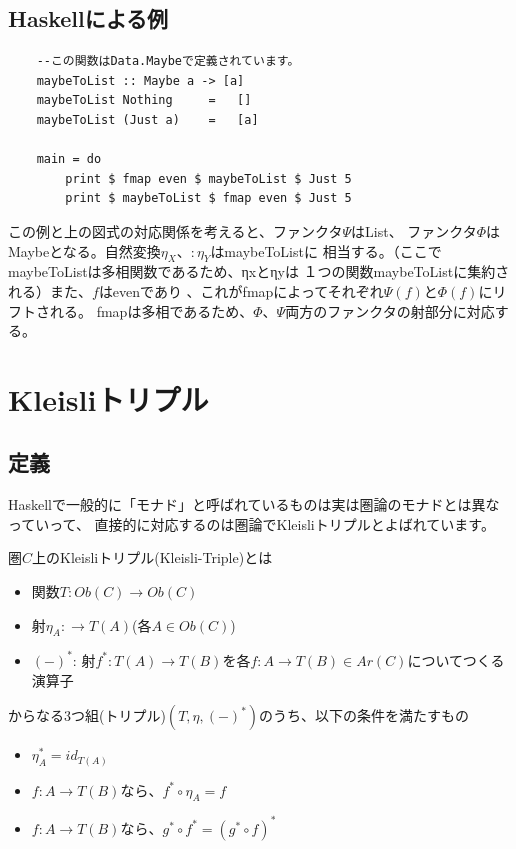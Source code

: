 \documentclass{jsarticle}
\begin{document}
\subsection{Haskellによる例}
\begin{lstlisting}
    --この関数はData.Maybeで定義されています。
    maybeToList :: Maybe a -> [a]
    maybeToList Nothing     =   []
    maybeToList (Just a)    =   [a]

    main = do
        print $ fmap even $ maybeToList $ Just 5
        print $ maybeToList $ fmap even $ Just 5
\end{lstlisting}
この例と上の図式の対応関係を考えると、ファンクタ$\Psi$はList、
ファンクタ$\Phi$はMaybeとなる。自然変換$\eta_X$、$:\eta_Y$はmaybeToListに
相当する。（ここでmaybeToListは多相関数であるため、ηxとηyは
１つの関数maybeToListに集約される）また、$f$はevenであり
、これがfmapによってそれぞれ$\Psi(f)$と$\Phi(f)$にリフトされる。
fmapは多相であるため、$\Phi$、$\Psi$両方のファンクタの射部分に対応する。

\newpage
\section{Kleisliトリプル}

\subsection{定義}
Haskellで一般的に「モナド」と呼ばれているものは実は圏論のモナドとは異なっていって、
直接的に対応するのは圏論でKleisliトリプルとよばれています。

圏$C$上のKleisliトリプル(Kleisli-Triple)とは
\begin{itemize}
    \item 関数$T:Ob(C)\to Ob(C)$
    \item 射$\eta_A:\to T(A)$(各$A\in Ob(C)$)
    \item $(-)^*$: 射$f^*:T(A)\to T(B)$を各$f:A\to T(B)\in Ar(C)$についてつくる演算子
\end{itemize}
からなる3つ組(トリプル)$(T, \eta, (-)^*)$のうち、以下の条件を満たすもの
\begin{itemize}
    \item $\eta_A^*=id_{T(A)}$
    \item $f:A\to T(B)$なら、$f^*\circ \eta_A=f$
    \item $f:A\to T(B)$なら、$g^*\circ f^*=(g^*\circ f)^*$
\end{itemize}
\end{document}

